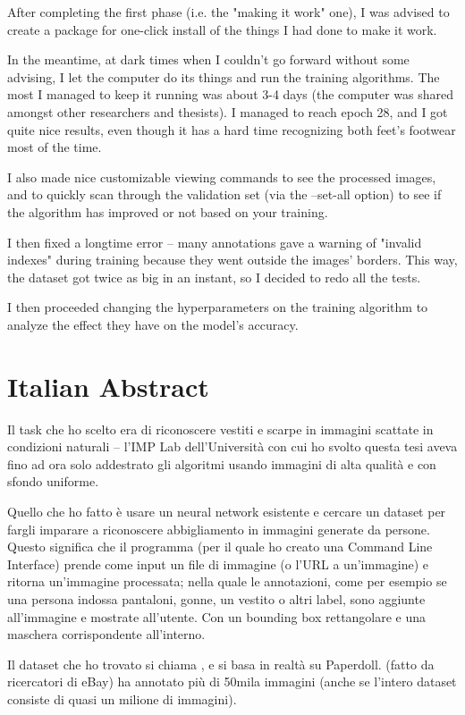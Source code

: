 After completing the first phase (i.e. the "making it work" one), I was advised to create a package for one-click install of the things I had done to make it work.

In the meantime, at dark times when I couldn't go forward without some advising, I let the computer do its things and run the training algorithms. The most I managed to keep it running was about 3-4 days (the computer was shared amongst other researchers and thesists). I managed to reach epoch 28, and I got quite nice results, even though it has a hard time recognizing both feet's footwear most of the time. 

I also made nice customizable viewing commands to see the processed images, and to quickly scan through the validation set (via the --set-all option) to see if the algorithm has improved or not based on your training.

I then fixed a longtime error -- many annotations gave a warning of "invalid indexes" during training because they went outside the images' borders. This way, the dataset got twice as big in an instant, so I decided to redo all the tests.

I then proceeded changing the hyperparameters on the training algorithm to analyze the effect they have on the model's accuracy.
\pagebreak

\section*{Italian Abstract}

Il task che ho scelto era di riconoscere vestiti e scarpe in immagini scattate in condizioni naturali -- l'IMP Lab dell'Università con cui ho svolto questa tesi aveva fino ad ora solo addestrato gli algoritmi usando immagini di alta qualità e con sfondo uniforme.

Quello che ho fatto è usare un neural network esistente e cercare un dataset per fargli imparare a riconoscere abbigliamento in immagini generate da persone. Questo significa che il programma (per il quale ho creato una Command Line Interface) prende come input un file di immagine (o l'URL a un'immagine) e ritorna un'immagine processata; nella quale le annotazioni, come per esempio se una persona indossa pantaloni, gonne, un vestito o altri label, sono aggiunte all'immagine e mostrate all'utente. Con un bounding box rettangolare e una maschera corrispondente all'interno.

Il dataset che ho trovato si chiama \modanet, e si basa in realtà su Paperdoll.
\modanet (fatto da ricercatori di eBay) ha annotato più di 50mila immagini (anche se l'intero dataset consiste di quasi un milione di immagini).

